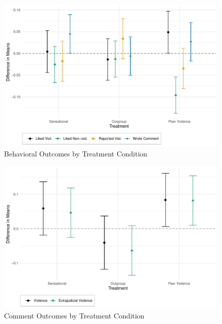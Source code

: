 \begin{figure}[!htbp]
  \centering
  \caption{Behavioral Outcomes by Treatment Condition}
  \includegraphics[width=.835\textwidth]{figures/ATE_behavioral.pdf}
\end{figure}


\begin{figure}[!htbp]
  \centering
  \caption{Comment Outcomes by Treatment Condition}
  \includegraphics[width=.835\textwidth]{figures/ATE_com_heckman.pdf}
\end{figure}

